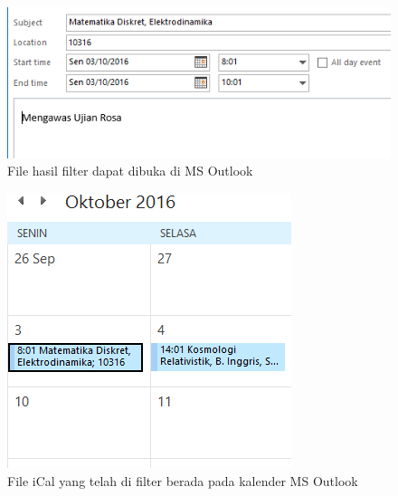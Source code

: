 			\begin{figure}[H]
			\centering
			\includegraphics[scale=0.8]{Gambar/hasilOutlookEksperimental2}
			\caption{File hasil filter dapat dibuka di MS Outlook}
			\label{fig:hasilOutlookFilterEksperimental2}
			\end{figure}
			
			\begin{figure}[H]
			\centering
			\includegraphics[scale=0.8]{Gambar/hasilOutlookFilterEksperimental}
			\caption{File iCal yang telah di filter berada pada kalender MS Outlook}
			\label{fig:hasilOutlookFilter}
			\end{figure}
			


